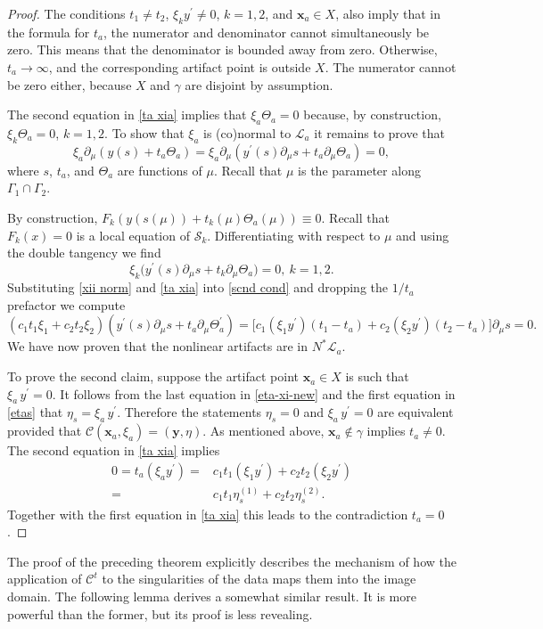 \documentclass[11pt]{article}
\newcommand{\be}{\begin{equation}}
\newcommand{\ee}{\end{equation}}
\newcommand{\s}{\mathcal S}
\newcommand{\cC}{\mathcal C}
\newcommand{\CL}{\mathcal L}
\newcommand{\pa}{\partial}
\newcommand{\ga}{\gamma}
\numberwithin{equation}{section}
\newcommand{\vy}{\mathbf{y}}
\newcommand{\vx}{\mathbf{x}}
\theoremstyle{definition}
\begin{document}
\begin{proof}
The conditions $t_1\not=t_2$, $\xi_k y^\prime\not=0$, $k=1,2$, and $\vx_a\in X$, also imply that in the formula for $t_a$, the numerator and denominator cannot simultaneously be zero. This means that the denominator is bounded away from zero. Otherwise, $t_a\to\infty$, and the corresponding artifact point is outside $X$. The numerator cannot be zero either, because $X$ and $\ga$ are disjoint by assumption.

The second equation in \eqref{ta xia} implies that $\xi_a\Theta_a=0$ because, by construction, $\xi_k\Theta_a=0$, $k=1,2$. To show that $\xi_a$ is (co)normal to $\CL_a$ it remains to prove that 
\be\label{scnd cond}
\xi_a \pa_{\mu}(y(s)+t_a\Theta_a)=\xi_a \pa_{\mu}(y^\prime(s)\pa_\mu s+t_a\pa_\mu\Theta_a)=0,
\ee
where $s$, $t_a$, and $\Theta_a$ are functions of $\mu$. Recall that $\mu$ is the parameter along $\Gamma_1\cap\Gamma_2$. 

By construction, $F_k(y(s(\mu))+t_k(\mu)\Theta_a(\mu))\equiv0$. Recall that $F_k(x)=0$ is a local equation of $\s_k$. Differentiating with respect to $\mu$ and using the double tangency we find
\be\label{xii norm}
\xi_k\big(y^\prime(s)\pa_\mu s+t_k\pa_\mu\Theta_a\big)=0,\ k=1,2.
\ee
Substituting \eqref{xii norm} and \eqref{ta xia} into \eqref{scnd cond} and dropping the $1/t_a$ prefactor we compute
\be
(c_1t_1\xi_1+c_2t_2\xi_2) (y^\prime(s)\pa_\mu s+t_a\pa_\mu\Theta_a^\prime)
=\big[c_1(\xi_1 y^\prime)(t_1-t_a)+c_2(\xi_2 y^\prime)(t_2-t_a)\big]\pa_\mu s=0.
\ee
We have now proven that the nonlinear artifacts are in $N^*\CL_a$.

To prove the second claim, suppose the artifact point $\vx_a\in X$ is such that $\xi_a\, y^\prime=0$. It follows from the last equation in \eqref{eta-xi-new} and the first equation in \eqref{etas} that $\eta_s=\xi_a\, y^\prime$. Therefore the statements $\eta_s=0$ and $\xi_a\, y^\prime=0$ are equivalent provided that $\cC(\vx_a,\xi_a)=(\vy,\eta)$. As mentioned above, $\vx_a\not\in\ga$ implies $t_a\not=0$. The second equation in \eqref{ta xia} implies
\be\label{ta xia cor}\begin{split}
0=t_a(\xi_a y^\prime)=&c_1t_1(\xi_1 y^\prime)+c_2t_2(\xi_2 y^\prime)\\
=&c_1t_1 \eta_s^{(1)}+c_2t_2\eta_s^{(2)}.
\end{split}
\ee
Together with the first equation in \eqref{ta xia} this leads to the contradiction $t_a=0$.   
\end{proof}

The proof of the preceding theorem explicitly describes the mechanism of how the application of $\cC^t$ to the singularities of the data maps them into the image domain. The following lemma derives a somewhat similar result. It is more powerful than the former, but its proof is less revealing.
\end{document}
